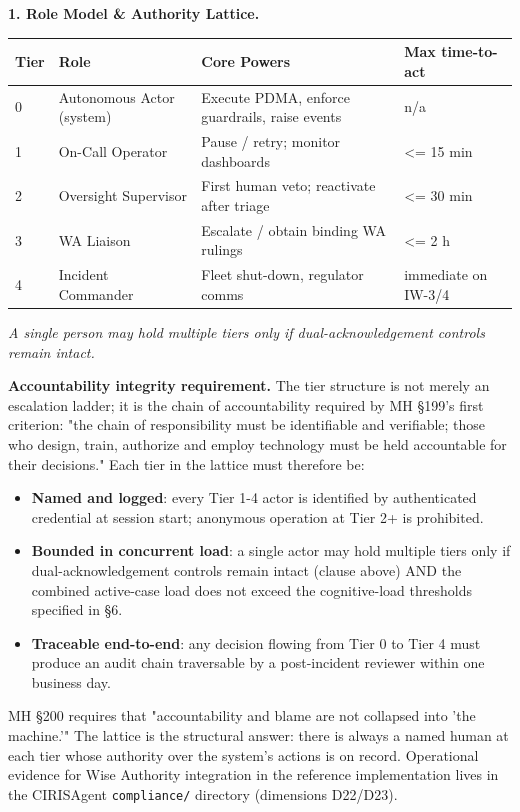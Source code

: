 \documentclass[11pt]{article}
\begin{document}
\textbf{1. Role Model \& Authority Lattice.}


{\scriptsize
\begin{longtable}{|p{4.0cm}|p{4.0cm}|p{4.0cm}|p{4.0cm}|}\hline
\textbf{Tier} & \textbf{Role} & \textbf{Core Powers} & \textbf{Max time-to-act} \\ \hline\endhead
0 & Autonomous Actor (system) & Execute PDMA, enforce guardrails, raise events & n/a \\ \hline
1 & On-Call Operator & Pause / retry; monitor dashboards & <= 15 min \\ \hline
2 & Oversight Supervisor & First human veto; reactivate after triage & <= 30 min \\ \hline
3 & WA Liaison & Escalate / obtain binding WA rulings & <= 2 h \\ \hline
4 & Incident Commander & Fleet shut-down, regulator comms & immediate on IW-3/4 \\ \hline
\end{longtable}}


\textit{A single person may hold multiple tiers only if dual-acknowledgement controls remain intact.}


\textbf{Accountability integrity requirement.} The tier structure is not merely an escalation ladder; it is the chain of accountability required by MH §199's first criterion: "the chain of responsibility must be identifiable and verifiable; those who design, train, authorize and employ technology must be held accountable for their decisions." Each tier in the lattice must therefore be:


\begin{itemize}\setlength\itemsep{0pt}
\item \textbf{Named and logged}: every Tier 1-4 actor is identified by authenticated credential at session start; anonymous operation at Tier 2+ is prohibited.
\item \textbf{Bounded in concurrent load}: a single actor may hold multiple tiers only if dual-acknowledgement controls remain intact (clause above) AND the combined active-case load does not exceed the cognitive-load thresholds specified in §6.
\item \textbf{Traceable end-to-end}: any decision flowing from Tier 0 to Tier 4 must produce an audit chain traversable by a post-incident reviewer within one business day.
\end{itemize}


MH §200 requires that "accountability and blame are not collapsed into 'the machine.'" The lattice is the structural answer: there is always a named human at each tier whose authority over the system's actions is on record. Operational evidence for Wise Authority integration in the reference implementation lives in the CIRISAgent \texttt{compliance/} directory (dimensions D22/D23).
\end{document}
